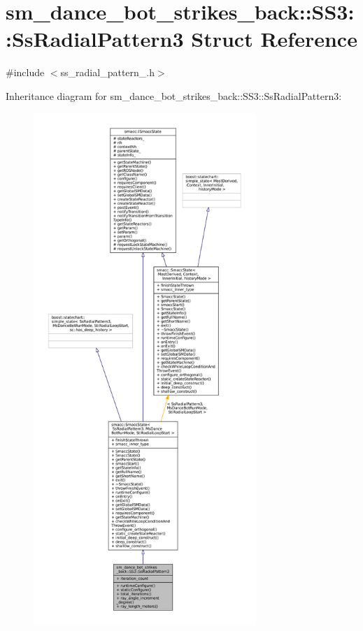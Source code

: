 \hypertarget{structsm__dance__bot__strikes__back_1_1SS3_1_1SsRadialPattern3}{}\section{sm\+\_\+dance\+\_\+bot\+\_\+strikes\+\_\+back\+:\+:S\+S3\+:\+:Ss\+Radial\+Pattern3 Struct Reference}
\label{structsm__dance__bot__strikes__back_1_1SS3_1_1SsRadialPattern3}


{\ttfamily \#include $<$ss\+\_\+radial\+\_\+pattern\+\_.\+h$>$}



Inheritance diagram for sm\+\_\+dance\+\_\+bot\+\_\+strikes\+\_\+back\+:\+:S\+S3\+:\+:Ss\+Radial\+Pattern3\+:
\nopagebreak
\begin{figure}[H]
\begin{center}
\leavevmode
\includegraphics[height=550pt]{structsm__dance__bot__strikes__back_1_1SS3_1_1SsRadialPattern3__inherit__graph}
\end{center}
\end{figure}


